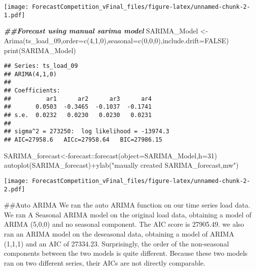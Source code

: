 \documentclass[
]{article}
\newenvironment{Shaded}{\begin{snugshade}}{\end{snugshade}}
\newcommand{\AttributeTok}[1]{\textcolor[rgb]{0.77,0.63,0.00}{#1}}
\newcommand{\ConstantTok}[1]{\textcolor[rgb]{0.00,0.00,0.00}{#1}}
\newcommand{\DecValTok}[1]{\textcolor[rgb]{0.00,0.00,0.81}{#1}}
\newcommand{\DocumentationTok}[1]{\textcolor[rgb]{0.56,0.35,0.01}{\textbf{\textit{#1}}}}
\newcommand{\FunctionTok}[1]{\textcolor[rgb]{0.00,0.00,0.00}{#1}}
\newcommand{\NormalTok}[1]{#1}
\newcommand{\OtherTok}[1]{\textcolor[rgb]{0.56,0.35,0.01}{#1}}
\newcommand{\SpecialCharTok}[1]{\textcolor[rgb]{0.00,0.00,0.00}{#1}}
\newcommand{\StringTok}[1]{\textcolor[rgb]{0.31,0.60,0.02}{#1}}
\begin{document}
\texttt{[image: ForecastCompetition\_vFinal\_files/figure-latex/unnamed-chunk-2-1.pdf]}

\begin{Shaded}
\begin{Highlighting}[]
\DocumentationTok{\#\#Forecast using manual sarima model }
\NormalTok{SARIMA\_Model }\OtherTok{\textless{}{-}} \FunctionTok{Arima}\NormalTok{(ts\_load\_09,}\AttributeTok{order=}\FunctionTok{c}\NormalTok{(}\DecValTok{4}\NormalTok{,}\DecValTok{1}\NormalTok{,}\DecValTok{0}\NormalTok{),}\AttributeTok{seasonal=}\FunctionTok{c}\NormalTok{(}\DecValTok{0}\NormalTok{,}\DecValTok{0}\NormalTok{,}\DecValTok{0}\NormalTok{),}\AttributeTok{include.drift=}\ConstantTok{FALSE}\NormalTok{)}
\FunctionTok{print}\NormalTok{(SARIMA\_Model)}
\end{Highlighting}
\end{Shaded}

\begin{verbatim}
## Series: ts_load_09 
## ARIMA(4,1,0) 
## 
## Coefficients:
##          ar1      ar2      ar3      ar4
##       0.0503  -0.3465  -0.1037  -0.1741
## s.e.  0.0232   0.0230   0.0230   0.0231
## 
## sigma^2 = 273250:  log likelihood = -13974.3
## AIC=27958.6   AICc=27958.64   BIC=27986.15
\end{verbatim}

\begin{Shaded}
\begin{Highlighting}[]
\NormalTok{SARIMA\_forecast}\OtherTok{\textless{}{-}}\NormalTok{forecast}\SpecialCharTok{::}\FunctionTok{forecast}\NormalTok{(}\AttributeTok{object=}\NormalTok{SARIMA\_Model,}\AttributeTok{h=}\DecValTok{31}\NormalTok{)}
\FunctionTok{autoplot}\NormalTok{(SARIMA\_forecast)}\SpecialCharTok{+}\FunctionTok{ylab}\NormalTok{(}\StringTok{"maually created SARIMA\_forecast,mw"}\NormalTok{)}
\end{Highlighting}
\end{Shaded}

\texttt{[image: ForecastCompetition\_vFinal\_files/figure-latex/unnamed-chunk-2-2.pdf]}

\#\#Auto ARIMA We ran the auto ARIMA function on our time series load
data. We ran A Seasonal ARIMA model on the original load data, obtaining
a model of ARIMA (5,0,0) and no seasonal component. The AIC score is
27905.49. we also ran an ARIMA model on the deseasonal data, obtaining a
model of ARIMA (1,1,1) and an AIC of 27334.23. Surprisingly, the order
of the non-seasonal components between the two models is quite
different. Because these two models ran on two different series, their
AICs are not directly comparable.
\end{document}
